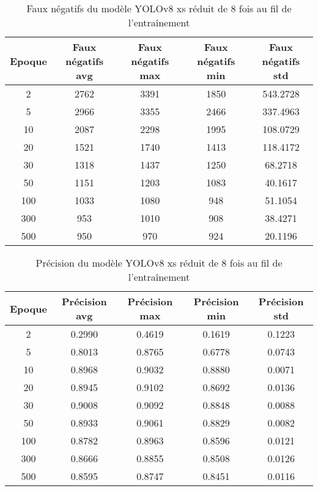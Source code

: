 \begin{table}[!ht]
    \caption{Faux négatifs du modèle YOLOv8 xs réduit de 8 fois au fil de l'entraînement}
    \label{tab:yolov8xs_reduced8x_false_negative}
    \centering
    \begin{tabular}{ |c||c|c|c|c|  }
        \hline
        \rowcolor{gray!50}
        Epoque & Faux négatifs avg & Faux négatifs max & Faux négatifs min & Faux négatifs std\\
        \hline
        2 & 2762 & 3391 & 1850 & 543.2728\\
        5 & 2966 & 3355 & 2466 & 337.4963\\
        10 & 2087 & 2298 & 1995 & 108.0729\\
        20 & 1521 & 1740 & 1413 & 118.4172\\
        30 & 1318 & 1437 & 1250 & 68.2718\\
        50 & 1151 & 1203 & 1083 & 40.1617\\
        100 & 1033 & 1080 & 948 & 51.1054\\
        300 & 953 & 1010 & 908 & 38.4271\\
        500 & 950 & 970 & 924 & 20.1196\\
        \hline
    \end{tabular}
\end{table}

\begin{table}[!ht]
    \caption{Précision du modèle YOLOv8 xs réduit de 8 fois au fil de l'entraînement}
    \label{tab:yolov8xs_reduced8x_precision}
    \centering
    \begin{tabular}{ |c||c|c|c|c|  }
        \hline
        \rowcolor{gray!50}
        Epoque & Précision avg & Précision max & Précision min & Précision std\\
        \hline
        2 & 0.2990 & 0.4619 & 0.1619 & 0.1223\\
        5 & 0.8013 & 0.8765 & 0.6778 & 0.0743\\
        10 & 0.8968 & 0.9032 & 0.8880 & 0.0071\\
        20 & 0.8945 & 0.9102 & 0.8692 & 0.0136\\
        30 & 0.9008 & 0.9092 & 0.8848 & 0.0088\\
        50 & 0.8933 & 0.9061 & 0.8829 & 0.0082\\
        100 & 0.8782 & 0.8963 & 0.8596 & 0.0121\\
        300 & 0.8666 & 0.8855 & 0.8508 & 0.0126\\
        500 & 0.8595 & 0.8747 & 0.8451 & 0.0116\\
        \hline
    \end{tabular}
\end{table}

